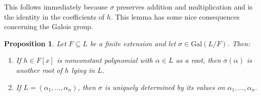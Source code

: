 \documentclass{article}
\makeatletter
\theoremstyle{definition}
\newtheorem{prop}{Proposition}
\theoremstyle{remark}
\let\oldproofname=\proofname
\renewcommand{\proofname}{\bf{\textit{\oldproofname}}}
\theoremstyle{definition}
\renewenvironment{proof}[1][\proofname]{\par
  \pushQED{\qed}%
  \normalfont \topsep6\p@\@plus6\p@\relax
  \list{}{\leftmargin=0mm
          \rightmargin=0mm
          \settowidth{\itemindent}{\itshape#1}%
          \labelwidth=\itemindent
          \parsep=0pt \listparindent=0mm%
  }
  \item[\hskip\labelsep
        \itshape
    #1\@addpunct{.}]\ignorespaces
}{%
  \popQED\endlist\@endpefalse
}
\makeatother
\begin{document}
        \begin{proof}
            This follows immediately because $\sigma$ preserves addition and multiplication and is the identity in the coefficients of $h$.
        \end{proof}
    This lemma has some nice consequences concerning the Galois group.
    \begin{prop}
        \textit{Let $F\subseteq L$ be a finite extension and let $\sigma\in\text{Gal}(L/F)$. Then:}
            \begin{enumerate}
                \item \textit{If $h\in F[x]$ is nonconstant polynomial with $\alpha\in L$ as a root, then $\sigma(\alpha)$ is another root of $h$ lying in $L$.}
                \item \textit{If $L=(\alpha_1,\dots,\alpha_n)$, then $\sigma$ is uniquely determined by its values on $\alpha_1,\dots,\alpha_n$.}
            \end{enumerate}
    \end{prop}
\end{document}
